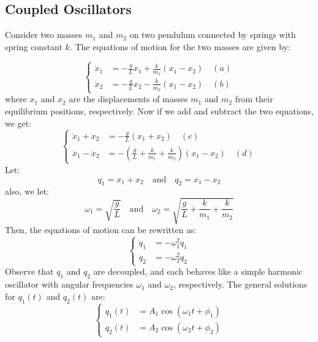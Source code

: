 \documentclass[11pt]{report}
\begin{document}
\subsection{Coupled Oscillators}
\begin{definition}
    Consider two masses \( m_1 \) and \( m_2 \) on two pendulum connected by springs with spring constant \( k \).  The equations of motion for the two masses are given by:

    \begin{equation}
        \begin{cases}
            \ddot{x}_1 &= -\frac{g}{L}x_1 + \frac{k}{m_1} (x_1 - x_2) \quad (a) \\
            \ddot{x}_2 &= -\frac{g}{L}x_2 - \frac{k}{m_2} (x_1 - x_2) \quad (b)
        \end{cases}
    \end{equation}
    where \( x_1 \) and \( x_2 \) are the displacements of masses \( m_1 \) and \( m_2 \) from their equilibrium positions, respectively. Now if we add and subtract the two equations, we get:
    $$
        \begin{cases}
            \ddot{x}_1 + \ddot{x}_2 &= -\frac{g}{L}(x_1 + x_2) \quad (c) \\
            \ddot{x}_1 - \ddot{x}_2 &= -\left(\frac{g}{L} + \frac{k}{m_1} + \frac{k}{m_2}\right)(x_1 - x_2) \quad (d)
        \end{cases}
    $$
    Let:
    $$ 
    q_1 = x_1 + x_2 \quad \text{and} \quad q_2 = x_1 - x_2
    $$
    also, we let:
    $$
        \omega_1 = \sqrt{\frac{g}{L}} \quad \text{and} \quad \omega_2 = \sqrt{\frac{g}{L} + \frac{k}{m_1} + \frac{k}{m_2}}
    $$
    Then, the equations of motion can be rewritten as:
    $$
        \begin{cases}
            \ddot{q}_1 &= -\omega_1^2 q_1 \\
            \ddot{q}_2 &= -\omega_2^2 q_2
        \end{cases}
    $$
    Observe that \( q_1 \) and \( q_2 \) are decoupled, and each behaves like a simple harmonic oscillator with angular frequencies \( \omega_1 \) and \( \omega_2 \), respectively. The general solutions for \( q_1(t) \) and \( q_2(t) \) are:
    \begin{equation}
        \begin{cases}
            q_1(t) &= A_1 \cos(\omega_1 t + \phi_1) \\
            q_2(t) &= A_2 \cos(\omega_2 t + \phi_2)
        \end{cases}

\end{equation}
\end{definition}
\end{document}

